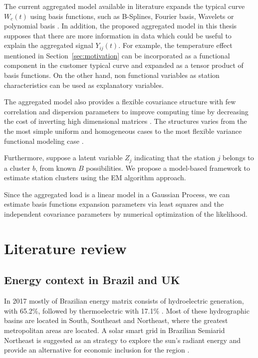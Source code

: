 The current aggregated model available in literature expands the typical curve $W_c(t)$ using basis functions, such as B-Splines, Fourier basis, Wavelets or polynomial basis \cite{dias2009non,dias2013hierarchical,dias2015aggregated}. In addition, the proposed aggregated model in this thesis supposes that there are more information in data which could be useful to explain the aggregated signal $Y_{ij}(t)$. For example, the temperature effect mentioned in Section~\ref{sec:motivation} can be incorporated as a functional component in the customer typical curve and expanded as a tensor product of basis functions. On the other hand, non functional variables as station characteristics can be used as explanatory variables.

The aggregated model also provides a flexible covariance structure with few correlation and dispersion parameters to improve computing time by decreasing the cost of inverting high dimensional matrices \cite{liu2018gaussian}. The structures varies from the the most simple uniform and homogeneous cases to the most flexible  variance functional modeling case \cite{dias2013hierarchical}.

Furthermore, suppose a latent variable $Z_j$ indicating that the station $j$ belongs to a cluster $b$, from known $B$ possibilities. We propose a model-based framework to estimate station clusters using the EM algorithm approach.

Since the aggregated load is a linear model in a Gaussian Process, we can estimate basis functions expansion parameters via least squares and the independent covariance parameters by numerical optimization of the likelihood.

\section{Literature review}\label{sec:literature}


\subsection{Energy context in Brazil and UK}
\label{sec:energy}

In 2017 mostly of Brazilian energy matrix consists of hydroelectric generation, with 65.2\%, followed by thermoelectric with 17.1\% \cite{epe2018}. Most of these hydrographic basins are located in South, Southeast and Northeast, where the greatest metropolitan areas are located. A solar smart grid in Brazilian Semiarid Northeast is suggested as an strategy to explore the sun's radiant energy and provide an alternative for economic inclusion for the region \cite{nobre2019solar}. 

